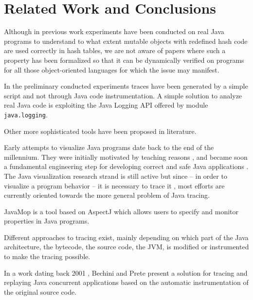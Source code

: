 \section{Related Work and Conclusions}
\label{sec:rel-concl}

Although in previous work \cite{NelsonEtAl2010} experiments have been conducted  on real Java programs to understand
to what extent mutable objects with redefined hash code are used correctly in hash tables, we are not aware of papers where
such a property has been formalized so that it can be dynamically verified on programs for all those object-oriented languages
for which the issue may manifest.

In the preliminary conducted experiments traces have been generated by a simple script and not through Java code instrumentation.
A simple solution to analyze real Java code is exploiting the Java Logging API offered by module \lstinline{java.logging}.

Other more sophisticated tools have been proposed in literature. %

Early attempts to visualize Java programs date back to the end of the millennium. They were initially motivated by teaching reasons \cite{dershem1999java}, and became soon a fundamental engineering step for developing correct and safe Java applications \cite{DBLP:conf/wcre/Systa00,DBLP:conf/dagstuhl/PauwJMSVY01}. The Java visualization research strand is still active \cite{DBLP:journals/spe/JayaramanJL17,DBLP:journals/spe/PJJS21} but since -- in order to visualize a program behavior -- it is necessary to trace it \cite{DBLP:conf/dagstuhl/Mehner01}, most efforts are currently oriented towards the more general problem of Java tracing.

JavaMop \cite{Chen2006} is a tool based on AspectJ which allows users to specify and monitor properties in Java programs.

Different approaches to tracing exist, mainly depending on which part of the Java architecture, the bytecode, the source code, the JVM, is modified or instrumented to make the tracing possible.

In a work dating back 2001 \cite{DBLP:journals/fgcs/BechiniP01}, Bechini and Prete present a solution for tracing and replaying Java concurrent applications based on the automatic instrumentation of the original source code.


